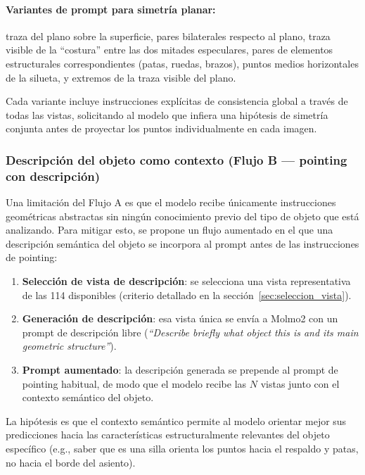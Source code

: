 \paragraph{Variantes de prompt para simetría planar:}
traza del plano sobre la superficie, pares bilaterales respecto al plano, traza
visible de la ``costura'' entre las dos mitades especulares, pares de elementos
estructurales correspondientes (patas, ruedas, brazos), puntos medios horizontales
de la silueta, y extremos de la traza visible del plano.

Cada variante incluye instrucciones explícitas de consistencia global a través de
todas las vistas, solicitando al modelo que infiera una hipótesis de simetría
conjunta antes de proyectar los puntos individualmente en cada imagen.

\subsubsection{Descripción del objeto como contexto (Flujo B — pointing con descripción)}

Una limitación del Flujo A es que el modelo recibe únicamente instrucciones
geométricas abstractas sin ningún conocimiento previo del tipo de objeto que está
analizando. Para mitigar esto, se propone un flujo aumentado en el que una
descripción semántica del objeto se incorpora al prompt antes de las instrucciones
de pointing:

\begin{enumerate}
    \item \textbf{Selección de vista de descripción}: se selecciona una vista
          representativa de las 114 disponibles (criterio detallado en la
          sección~\ref{sec:seleccion_vista}).
    \item \textbf{Generación de descripción}: esa vista única se envía a Molmo2
          con un prompt de descripción libre (\textit{``Describe briefly what
          object this is and its main geometric structure''}).
    \item \textbf{Prompt aumentado}: la descripción generada se prepende al prompt
          de pointing habitual, de modo que el modelo recibe las $N$ vistas junto
          con el contexto semántico del objeto.
\end{enumerate}

La hipótesis es que el contexto semántico permite al modelo orientar mejor sus
predicciones hacia las características estructuralmente relevantes del objeto
específico (e.g., saber que es una silla orienta los puntos hacia el respaldo y
patas, no hacia el borde del asiento).

